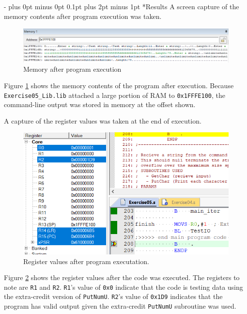 \documentclass[\FontSize\FontUnit,letterpaper,oneside]{article}
\makeatletter
\def\code#1{\texttt{#1}}
\renewcommand \section{
    \@startsection{section}{1}{\z@}
      {\dimexpr \FontSize\FontUnit * 2 - \parskip \relax plus 0pt minus 0pt}
      {0.1pt plus 2pt minus 1pt} %
      {\normalfont\normalsize\bfseries}}
\makeatother
\begin{document}
\section*{Results}
A screen capture of the memory contents after program execution was taken.

\begin{figure}[h!]
	\centering
	\includegraphics[width=\textwidth]{mem_cap}
	\caption{Memory after program execution}
	\label{fig:capture1}
\end{figure}

Figure \ref{fig:capture1} shows the memory contents of the program after execution. Because \code{Exercise05\_Lib.lib} attached a large portion of RAM to \code{0x1FFFE100}, the command-line output was stored in memory at the offset shown.

A capture of the register values was taken at the end of execution.

\begin{figure}[h!]
	\centering
	\includegraphics[]{reg_cap.png}
	\caption{Register values after program executation.}
	\label{fig:reg}
\end{figure}

Figure \ref{fig:reg} shows the register values after the code was executed. The registers to note are \code{R1} and \code{R2}. \code{R1}'s value of \code{0x0} indicate that the code is testing data using the extra-credit version of \code{PutNumU}. \code{R2}'s value of \code{0x1D9} indicates that the program has valid output given the extra-credit \code{PutNumU} subroutine was used.
\end{document}
